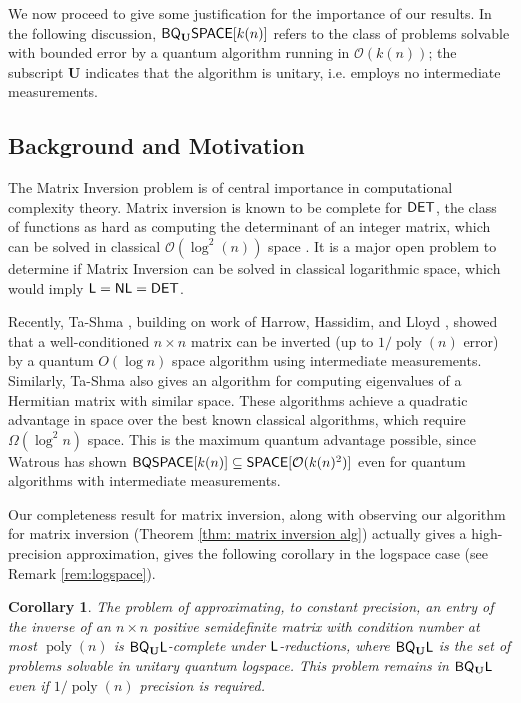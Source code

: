 \documentclass[11pt]{article}
\newtheorem{corollary}[theorem]{Corollary}
\theoremstyle{definition}
\theoremstyle{remark}
\newcommand\DET{{\sf{DET}}}
\newcommand\DSPACE{{\sf{SPACE}}}
\newcommand\BQSPACE{{\sf{BQSPACE}}}
\newcommand\Logspace{{\sf{L}}}
\newcommand\NL{{\sf{NL}}}
\newcommand{\classfont}{\sf}
\newcommand{\Unitary}{\mathbf{U}}
\newcommand{\unitaryBQL}{{\classfont{BQ}_\Unitary\classfont{L}}}
\newcommand{\unitaryBQSPACE}[1]{{\classfont{BQ}_\Unitary\classfont{SPACE}}[#1]}
\newcommand\bigoh{\mathcal{O}}
\DeclareMathOperator{\poly}{poly}
\begin{document}
We now proceed to give some justification for the importance of our results.  In the following discussion, $\unitaryBQSPACE{k(n)}$ refers to the class of problems solvable with bounded error by a quantum algorithm running in $\mathcal{O}(k(n))$; the subscript $\Unitary$ indicates that the algorithm is unitary, i.e. employs no intermediate measurements.

\subsection{Background and Motivation}
The Matrix Inversion problem is of central importance in computational complexity theory.  Matrix inversion is known to be complete for $\DET$, the class of functions as hard as computing the determinant of an integer matrix, which can be solved in classical $\mathcal{O}(\log^{2}(n))$ space \cite{berkowitz, cook}. It is a major open problem to determine if Matrix Inversion can be solved in classical logarithmic space, which would imply $\Logspace=\NL=\DET$.
 
Recently, Ta-Shma \cite{tashma}, building on work of Harrow, Hassidim, and Lloyd \cite{HHL}, showed that a well-conditioned $n \times n$ matrix can be inverted (up to $1/\poly(n)$ error) by a quantum $O(\log n)$ space algorithm using intermediate measurements. Similarly, Ta-Shma also gives an algorithm for computing eigenvalues of a Hermitian matrix with similar space. These algorithms achieve a quadratic advantage in space over the best known classical algorithms, which require $\Omega(\log^2n)$ space.  This is the maximum quantum advantage possible, since Watrous has shown $\BQSPACE[k(n)]\subseteq\DSPACE[\bigoh(k(n)^2)]$ \cite{Watrous99,Watrous03} even for quantum algorithms with intermediate measurements.

Our completeness result for matrix inversion, along with observing our algorithm for matrix inversion (Theorem \ref{thm: matrix inversion alg}) actually gives a high-precision approximation, gives the following corollary in the logspace case (see Remark \ref{rem:logspace}).
\begin{corollary}
The problem of approximating, to constant precision, an entry of the inverse of an $n \times n$ positive semidefinite matrix with condition number at most $\poly(n)$ is $\unitaryBQL$-complete under $\Logspace$-reductions, where $\unitaryBQL$ is the set of problems solvable in unitary quantum logspace. This problem remains in $\unitaryBQL$ even if $1/\poly(n)$ precision is required.
\end{corollary}
\end{document}
